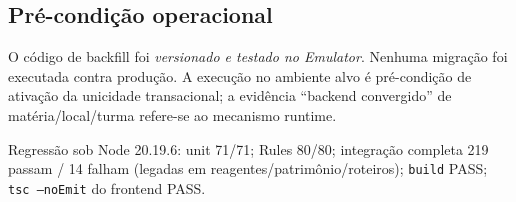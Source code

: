 \subsection{Pré-condição operacional}

O código de backfill foi \emph{versionado e testado no Emulator}. Nenhuma
migração foi executada contra produção. A execução no ambiente alvo é
pré-condição de ativação da unicidade transacional; a evidência ``backend
convergido'' de matéria/local/turma refere-se ao mecanismo runtime.

Regressão sob Node 20.19.6: unit 71/71; Rules 80/80; integração completa 219
passam / 14 falham (legadas em reagentes/patrimônio/roteiros); \texttt{build}
PASS; \texttt{tsc --noEmit} do frontend PASS.
